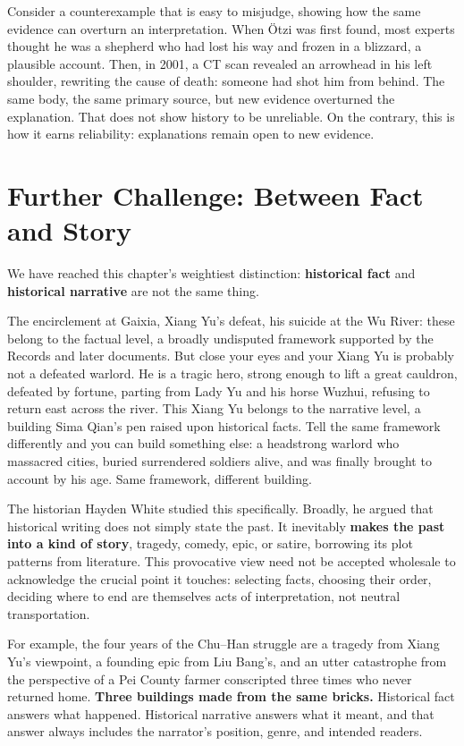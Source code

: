 Consider a counterexample that is easy to misjudge, showing how the same evidence can overturn an interpretation. When Ötzi was first found, most experts thought he was a shepherd who had lost his way and frozen in a blizzard, a plausible account. Then, in 2001, a CT scan revealed an arrowhead in his left shoulder, rewriting the cause of death: someone had shot him from behind. The same body, the same primary source, but new evidence overturned the explanation. That does not show history to be unreliable. On the contrary, this is how it earns reliability: explanations remain open to new evidence.

\section{Further Challenge: Between Fact and Story}

We have reached this chapter's weightiest distinction: \textbf{historical fact} and \textbf{historical narrative} are not the same thing.

The encirclement at Gaixia, Xiang Yu's defeat, his suicide at the Wu River: these belong to the factual level, a broadly undisputed framework supported by the Records and later documents. But close your eyes and your Xiang Yu is probably not a defeated warlord. He is a tragic hero, strong enough to lift a great cauldron, defeated by fortune, parting from Lady Yu and his horse Wuzhui, refusing to return east across the river. This Xiang Yu belongs to the narrative level, a building Sima Qian's pen raised upon historical facts. Tell the same framework differently and you can build something else: a headstrong warlord who massacred cities, buried surrendered soldiers alive, and was finally brought to account by his age. Same framework, different building.

The historian Hayden White studied this specifically. Broadly, he argued that historical writing does not simply state the past. It inevitably \textbf{makes the past into a kind of story}, tragedy, comedy, epic, or satire, borrowing its plot patterns from literature. This provocative view need not be accepted wholesale to acknowledge the crucial point it touches: selecting facts, choosing their order, deciding where to end are themselves acts of interpretation, not neutral transportation.

For example, the four years of the Chu--Han struggle are a tragedy from Xiang Yu's viewpoint, a founding epic from Liu Bang's, and an utter catastrophe from the perspective of a Pei County farmer conscripted three times who never returned home. \textbf{Three buildings made from the same bricks.} Historical fact answers what happened. Historical narrative answers what it meant, and that answer always includes the narrator's position, genre, and intended readers.

